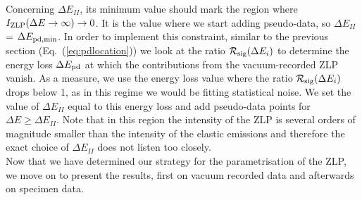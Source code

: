 Concerning $\Delta E_{II}$, its minimum value should mark the region where $I_{\rm ZLP}(\Delta E\to \infty)\to 0$. 
%
It is the value where we start adding pseudo-data, so $\Delta E_{II}$ = $\Delta E_{\rm pd,min}$.
%
In order to implement this constraint, similar to the previous section (Eq.~(\ref{eq:pdlocation}))
we look at the ratio 
$\mathcal{R}_{\rm sig}(\Delta E_i)$ to determine the energy loss $\Delta E_{\rm pd}$ at 
which the contributions from the vacuum-recorded ZLP vanish. 
%
As a measure, we use the energy loss value where the ratio $\mathcal{R}_{\rm sig}(\Delta E_i)$ drops below 1,
as in this regime we would be fitting statistical noise.
%
We set the value of $\Delta E_{II}$ equal to this energy loss and add pseudo-data points for $\Delta E \ge \Delta E_{II}$.
%
Note that in this region the intensity of the ZLP is several orders of magnitude smaller than the intensity 
of the elastic emissions and therefore the exact choice of $\Delta E_{II}$ does not listen too closely.\\

Now that we have determined our strategy for the parametrisation of the ZLP, we move on to present the results,
first on vacuum recorded data and afterwards on specimen data.
